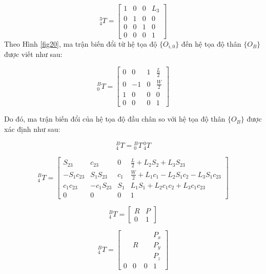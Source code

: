 \begin{equation}
{}^{3}_{4}T=
\begin{bmatrix}
1 & 0 & 0 & L_3 \\
0 & 1 & 0 & 0 \\
0 & 0 & 1 & 0 \\
0 & 0 & 0 & 1
\end{bmatrix}
\end{equation}
Theo Hình \ref{fig20}, ma trận biến đổi từ hệ tọa độ $\{O_{i,0}\}$ đến hệ tọa độ thân $\{O_B\}$ được viết như sau:

\begin{equation}
^{B}_{0}T=
\begin{bmatrix}
0 & 0 & 1 & \frac{L}{2} \\
0 & -1 & 0 & \frac{W}{2} \\
1 & 0 & 0 & 0 \\
0 & 0 & 0 & 1
\end{bmatrix}
\end{equation}

Do đó, ma trận biến đổi của hệ tọa độ đầu chân so với hệ tọa độ thân $\{O_B\}$ được xác định như sau:

\begin{equation}
^{B}_{4}T = {}^{B}_{0}T \, {}^{0}_{4}T
\end{equation}

\begin{equation}
{}^{B}_{4}T =
\begin{bmatrix}
S_{23} & c_{23} & 0 & \frac{L}{2} + L_2 S_2 + L_3 S_{23} \\
- S_1 c_{23} & S_1 S_{23} & c_1 & \frac{W}{2} + L_1 c_1 - L_2 S_1 c_2 - L_3 S_1 c_{23} \\
c_1 c_{23} & - c_1 S_{23} & S_1 & L_1 S_1 + L_2 c_1 c_2 + L_3 c_1 c_{23} \\
0 & 0 & 0 & 1
\end{bmatrix}
\end{equation}

\begin{equation}
{}^{B}_{4}T=
\begin{bmatrix}
R & P \\
0 & 1
\end{bmatrix}
\end{equation}

\begin{equation}
{}^{B}_{4}T=
\begin{bmatrix}
 &  &  & P_x \\
 & R &  & P_y \\
 &  &  & P_z \\
0 & 0 & 0 & 1
\end{bmatrix}
\end{equation}

